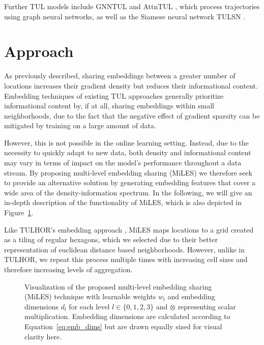\documentclass{article} %
\theoremstyle{definition}
\begin{document}
Further TUL models include GNNTUL \citep{zhouTrajectoryUserLinkingGraph2021a} and AttnTUL \citep{chenTrajectoryUserLinkingHierarchical2024}, which process trajectories using graph neural networks, as well as the Siamese neural network TULSN \citep{yuTULSNSiameseNetwork2020a}.



\section{Approach}\label{sec:approach}

As previously described, sharing embeddings between a greater number of locations increases their gradient density but reduces their informational content.
Embedding techniques of existing TUL approaches generally prioritize informational content by, if at all, sharing embeddings within small neighborhoods, due to the fact that the negative effect of gradient sparsity can be mitigated by training on a large amount of data.

However, this is not possible in the online learning setting.
Instead, due to the necessity to quickly adapt to new data, both density and informational content may vary in terms of impact on the model's performance throughout a data stream.
By proposing multi-level embedding sharing (MiLES) we therefore seek to provide an alternative solution by generating embedding features that cover a wide area of the density-information spectrum.
In the following, we will give an in-depth description of the functionality of MiLES, which is also depicted in Figure~\ref{fig:approach}.


Like TULHOR's embedding approach \citep{alsaeedTrajectoryUserLinkingUsing2023a}, MiLES maps locations to a grid created as a tiling of regular hexagons, which we selected due to their better representation of euclidean distance based neighborhoods.
However, unlike in TULHOR, we repeat this process multiple times with increasing cell sizes and therefore increasing levels of aggregation.

\begin{figure}[ht]
    \centering
    \resizebox{\textwidth}{!}{
        
    }
    \caption{Visualization of the proposed multi-level embedding sharing (MiLES) technique with learnable weights $w_l$ and embedding dimensions $d_l$ for each level $l\in \{0,1,2,3\}$ and $\otimes$ representing scalar multiplication. Embedding dimensions are calculated according to Equation~\ref{eq:emb_dims} but are drawn equally sized for visual clarity here.}
    \label{fig:approach}
\end{figure}
\end{document}

